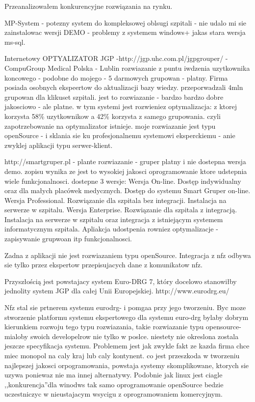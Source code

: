 Przeanalizowałem konkurencyjne rozwiązania na rynku.

MP-System - potezny system do kompleksowej oblsugi szpitali - nie udalo mi sie zainstalowac wersji DEMO - problemy z systemem windows+ jakas stara wersja ms-sql.

Internetowy OPTYALIZATOR JGP -http://jgp.uhc.com.pl/jgpgrouper/ - CompuGroup Medical Polska - Lublin
rozwiazanie z puntu iwdzenia uzytkownika koncowego - podobne do mojego - 5 darmowych grupowan - platny. Firma posiada osobnych ekspeertow do aktualizacji bazy wiedzy. przeporwadzali 4mln grupowan dla klikuset szpitali. jest to rozwiazanie - bardzo bardzo dobre jakosciowo - ale platne.
w tym systemi jest rozwieniez optymalizacja: z ktorej korzysta 58\% uzytkownikow a 42\% korzysta z samego grupowania. czyli zapotrzebowanie na optymalizator istnieje. moje rozwiazanie jest typu openSource - i sklania sie ku profesjonalnemu systemowi eksperckiemu - anie zwyklej aplikacji typu serwer-klient.


http://smartgruper.pl - plante rozwiazanie - gruper platny i nie dostepna wersja demo. zopisu wynika ze jest to wysokiej jakosci oprogramowanie ktore udstepnia wiele funkcjonalnosci. dostepne 3 wersje:
Wersja On-line. Dostęp indywidualny oraz dla małych placówek medycznych. Dostęp do systemu Smart Gruper on-line.
Wersja Professional. Rozwiązanie dla szpitala bez integracji. Instalacja na serwerze w szpitalu.
Wersja Enterprise. Rozwiązanie dla szpitala z integracją. Instalacja na serwerze w szpitalu oraz integracja z istniejącym systemem informatycznym szpitala. Apliakcja udostpenia rowniez optymalizacje - zapisywanie grupwoan itp funkcjonalnosci.

Zadna z aplikacji nie jest rozwiazaniem typu openSource. Integracja z nfz odbywa sie tylko przez ekspertow przepisujacych dane z komunikatow nfz. 

Przyszłością jest powstajacy system Euro-DRG 7, który docelowo stanowiłby jednolity system JGP dla całej Unii Europejskiej.
http://www.eurodrg.eu/

Nfz stal sie prtnerem systemu eurodrg- i pomgaa przy jego tworzeniu. Byc moze stworzenie platformu systemu ekspertowego dla systemu euro-drg bylaby dobrym kierunkiem rozwoju tego typu rozwiazania, takie rozwiazanie typu opensource- mialoby swoich developelrow nie tylko w poslce. niestety nie okreslona zostala jeszcze specyfikacja systemu. Problemem jest jak zwykle fakt ze kazda firma chce miec monopol na caly kraj lub caly kontynent. co jest przeszkoda w tworzeniu najlepszej jakosci orpogramowania, powstaja systemy skomplikowane, ktorych sie uzywa poniewaz nie ma innej alternatywy. Podobnie jak linux jest ciagle ,,konkurencja''dla winodws tak samo oprogramowanie openSource bedzie uczestniczyc w nieustajacym wsycigu z oprogramowaniem komercyjnym. 


